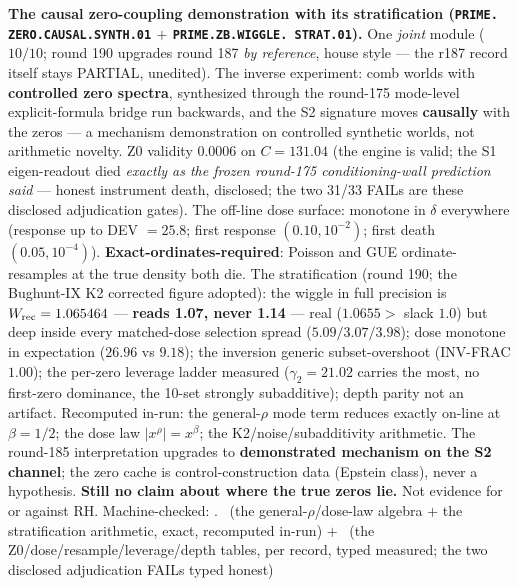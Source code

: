 \documentclass[11pt,a4paper]{article}
\theoremstyle{definition}
\begin{document}
\par\smallskip\noindent\textbf{The causal zero-coupling
demonstration with its stratification (\texttt{PRIME.\allowbreak
ZERO.\allowbreak CAUSAL.\allowbreak SYNTH.01} $+$
\texttt{PRIME.\allowbreak ZB.\allowbreak WIGGLE.\allowbreak
STRAT.01}).}
One \emph{joint} module ($10/10$; round 190 upgrades round 187
\emph{by reference}, house style --- the r187 record itself stays
PARTIAL, unedited).  The inverse experiment: comb worlds with
\textbf{controlled zero spectra}, synthesized through the
round-175 mode-level explicit-formula bridge run backwards, and
the S2 signature moves \textbf{causally} with the zeros --- a
mechanism demonstration on controlled synthetic worlds, not
arithmetic novelty.  Z0 validity $0.0006$ on $C = 131.04$ (the
engine is valid; the S1 eigen-readout died \emph{exactly as the
frozen round-175 conditioning-wall prediction said} --- honest
instrument death, disclosed; the two 31/33 FAILs are these
disclosed adjudication gates).  The off-line dose surface:
monotone in $\delta$ everywhere (response up to DEV $= 25.8$;
first response $(0.10, 10^{-2})$; first death $(0.05,
10^{-4})$).  \textbf{Exact-ordinates-required}: Poisson and GUE
ordinate-resamples at the true density both die.  The
stratification (round 190; the Bughunt-IX K2 corrected figure
adopted): the wiggle in full precision is $W_{\rm rec} =
1.065464$ --- \textbf{reads 1.07, never 1.14} --- real
($1.0655 >$ slack $1.0$) but deep inside every matched-dose
selection spread ($5.09/3.07/3.98$); dose monotone in
expectation ($26.96$ vs $9.18$); the inversion generic
subset-overshoot (INV-FRAC $1.00$); the per-zero leverage ladder
measured ($\gamma_2 = 21.02$ carries the most, no first-zero
dominance, the 10-set strongly subadditive); depth parity not an
artifact.  Recomputed in-run: the general-$\rho$ mode term
reduces exactly on-line at $\beta = 1/2$; the dose law
$|x^{\rho}| = x^{\beta}$; the K2/noise/subadditivity arithmetic.
The round-185 interpretation upgrades to \textbf{demonstrated
mechanism on the S2 channel}; the zero cache is
control-construction data (Epstein class), never a hypothesis.
\textbf{Still no claim about where the true zeros lie.}  Not
evidence for or against RH.
Machine-checked: .
\mE\ (the general-$\rho$/dose-law algebra $+$ the stratification
arithmetic, exact, recomputed in-run) $+$ \mC\ (the
Z0/dose/resample/leverage/depth tables, per record, typed
measured; the two disclosed adjudication FAILs typed honest)
\par\smallskip
\end{document}
